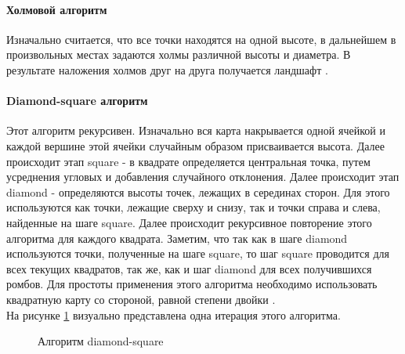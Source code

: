 \documentclass{article}
\begin{document}
	\paragraph{ Холмовой алгоритм }
	\indent Изначально считается, что все точки находятся на одной высоте, в дальнейшем в произвольных местах задаются холмы различной высоты и диаметра. В результате наложения холмов друг на друга получается ландшафт \cite{hillAlg}.
	\paragraph{ Diamond-square алгоритм }
	Этот алгоритм рекурсивен. Изначально вся карта накрывается одной ячейкой и каждой вершине этой ячейки случайным образом присваивается высота. Далее происходит этап square - в квадрате определяется центральная точка, путем усреднения угловых и добавления случайного отклонения. Далее происходит этап diamond - определяются высоты точек, лежащих в серединах сторон. Для этого используются как точки, лежащие сверху и снизу, так и точки справа и слева, найденные на шаге square. Далее происходит рекурсивное повторение этого алгоритма для каждого квадрата. Заметим, что так как в шаге diamond используются точки, полученные на шаге square, то шаг square проводится для всех текущих квадратов, так же, как и шаг diamond для всех получившихся ромбов. Для простоты применения этого алгоритма необходимо использовать квадратную карту со стороной, равной степени двойки \cite{diamond-square}.
	\\ \indent На рисунке \hyperref[diamondSquareDemonstrationSchema]{\ref{diamondSquareDemonstrationSchema}} визуально представлена одна итерация этого алгоритма.
	\begin{figure}[H]
		 	\caption{Алгоритм diamond-square}
		 	\label{diamondSquareDemonstrationSchema}
	 	\end{figure}
\end{document}
